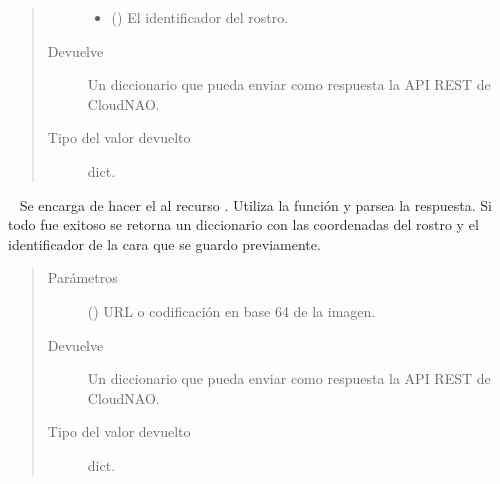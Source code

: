 \begin{fulllineitems}
\begin{fulllineitems}
\begin{quote}
\begin{description}
\begin{itemize}
\item {} 
 () \textendash{} El identificador del rostro.

\end{itemize}

\item[{Devuelve}] \leavevmode
Un diccionario que pueda enviar como respuesta la API REST de CloudNAO.

\item[{Tipo del valor devuelto}] \leavevmode
dict.

\end{description}\end{quote}

\end{fulllineitems}


\begin{fulllineitems}
\label{\detokenize{chapter_two/desc_cloudnao:app.tpa_client_libraries.kairos_client.Kairos.recognize}}~
Se encarga de hacer el  al recurso . Utiliza la
función {\hyperref[\detokenize{chapter_two/desc_cloudnao:app.utils.requests_utils.make_request}]{}} y parsea la
respuesta. Si todo fue exitoso se retorna
un diccionario con las coordenadas del rostro y
el identificador de la cara que se guardo previamente.
\begin{quote}\begin{description}
\item[{Parámetros}] \leavevmode
{} () \textendash{} URL o codificación en base 64 de la imagen.

\item[{Devuelve}] \leavevmode
Un diccionario que pueda enviar como respuesta la API REST de CloudNAO.

\item[{Tipo del valor devuelto}] \leavevmode
dict.

\end{description}\end{quote}

\end{fulllineitems}


\end{fulllineitems}

